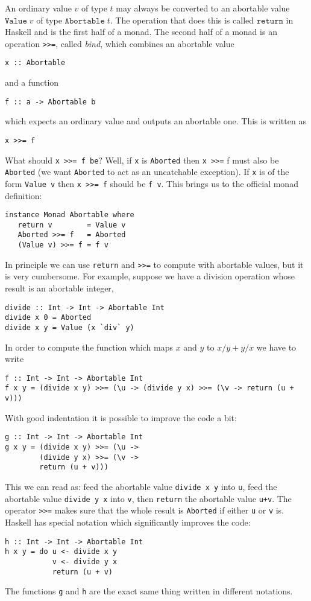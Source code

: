 \documentclass[a4paper,10pt]{article}
\newcommand{\cc}[1]{\lstinline{#1}}
\begin{document}
An ordinary value $v$ of type $t$ may always be converted to an abortable value $\mathtt{Value}\;v$ of type $\mathtt{Abortable}\;t$. The operation that does this is called $\mathtt{return}$ in Haskell and is the first half of a monad. The second half of a monad is an operation \cc{>>=}, called \emph{bind}, which combines an abortable value
%
\begin{lstlisting}
x :: Abortable
\end{lstlisting}
%
and a function
\begin{lstlisting}
f :: a -> Abortable b  
\end{lstlisting}
%
which expects an ordinary value and outputs an abortable one. This is written as
%
\begin{lstlisting}
x >>= f
\end{lstlisting}
%
What should \cc{x >>= f be}? Well, if \cc{x} is \cc{Aborted} then \cc{x >>=} f must also be \cc{Aborted} (we want \cc{Aborted} to act as an uncatchable exception). If \cc{x} is of the form \cc{Value v} then \cc{x >>= f} should be \cc{f v}. This brings us to the official monad definition:
%
\begin{lstlisting}
instance Monad Abortable where
   return v        = Value v
   Aborted >>= f   = Aborted
   (Value v) >>= f = f v
\end{lstlisting}
%
In principle we can use \cc{return} and \cc{>>=} to compute with abortable values, but it is very cumbersome. For example, suppose we have a division operation whose result is an abortable integer,
%
\begin{lstlisting}
divide :: Int -> Int -> Abortable Int
divide x 0 = Aborted
divide x y = Value (x `div` y)  
\end{lstlisting}
%
In order to compute the function which maps $x$ and $y$ to $x/y + y/x$ we have to write
%
\begin{lstlisting}
f :: Int -> Int -> Abortable Int
f x y = (divide x y) >>= (\u -> (divide y x) >>= (\v -> return (u + v)))
\end{lstlisting}
%
With good indentation it is possible to improve the code a bit:
%
\begin{lstlisting}
g :: Int -> Int -> Abortable Int
g x y = (divide x y) >>= (\u ->
        (divide y x) >>= (\v ->
        return (u + v)))
\end{lstlisting}
%
This we can read as: feed the abortable value \cc{divide x y} into \cc{u}, feed the abortable value \cc{divide y x} into \cc{v}, then \cc{return} the abortable value \cc{u+v}. The operator \cc{>>=} makes sure that the whole result is \cc{Aborted} if either \cc{u} or \cc{v} is. Haskell has special notation which significantly improves the code:
%
\begin{lstlisting}
h :: Int -> Int -> Abortable Int
h x y = do u <- divide x y
           v <- divide y x
           return (u + v)
\end{lstlisting}
%
The functions \cc{g} and \cc{h} are the exact same thing written in different notations.
\end{document}
